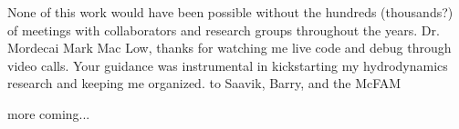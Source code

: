 None of this work would have been possible without the hundreds (thousands?) of meetings with collaborators and research groups throughout the years.
Dr. Mordecai Mark Mac Low, thanks for watching me live code and debug through video calls.
Your guidance was instrumental in kickstarting my hydrodynamics research and keeping me organized.
to Saavik, Barry, and the McFAM

more coming...

















